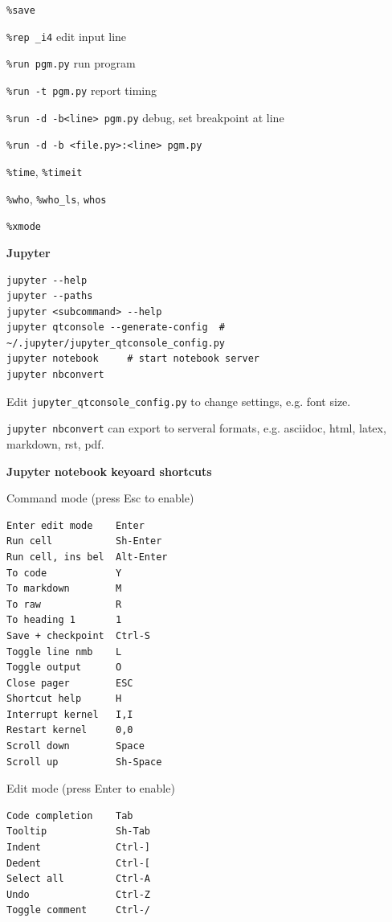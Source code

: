 \documentclass[9pt,a4wide]{extarticle}
\begin{document}
\begin{multicols}{3}
{\tt \%save}

{\tt \%rep \_i4} \rval edit input line

{\tt \%run pgm.py} \rval run program

{\tt \%run -t pgm.py} \rval report timing

{\tt \%run -d -b<line> pgm.py} \rval debug, set breakpoint at line

{\tt \%run -d -b <file.py>:<line> pgm.py}

{\tt \%time}, {\tt \%timeit}

{\tt \%who}, {\tt \%who\_ls}, {\tt whos}

{\tt \%xmode}

\end{multicols}

\medskip




\medskip
{\bf Jupyter}

\begin{verbatim}
jupyter --help
jupyter --paths
jupyter <subcommand> --help
jupyter qtconsole --generate-config  # ~/.jupyter/jupyter_qtconsole_config.py
jupyter notebook     # start notebook server
jupyter nbconvert    
\end{verbatim}

Edit {\tt jupyter\_qtconsole\_config.py} to change settings, e.g. font size.

{\tt jupyter nbconvert} can export to serveral formats, e.g. asciidoc, html,
latex, markdown, rst, pdf.

\medskip

{\bf Jupyter notebook keyoard shortcuts}

Command mode (press Esc to enable)

\begin{verbatim}      
Enter edit mode    Enter
Run cell           Sh-Enter
Run cell, ins bel  Alt-Enter
To code            Y
To markdown        M
To raw             R
To heading 1       1
Save + checkpoint  Ctrl-S
Toggle line nmb    L
Toggle output      O
Close pager        ESC
Shortcut help      H
Interrupt kernel   I,I
Restart kernel     0,0
Scroll down        Space
Scroll up          Sh-Space
\end{verbatim}      

Edit mode (press Enter to enable)

\begin{verbatim}      
Code completion    Tab
Tooltip            Sh-Tab
Indent             Ctrl-]
Dedent             Ctrl-[
Select all         Ctrl-A
Undo               Ctrl-Z
Toggle comment     Ctrl-/
\end{verbatim}      
\end{document}
